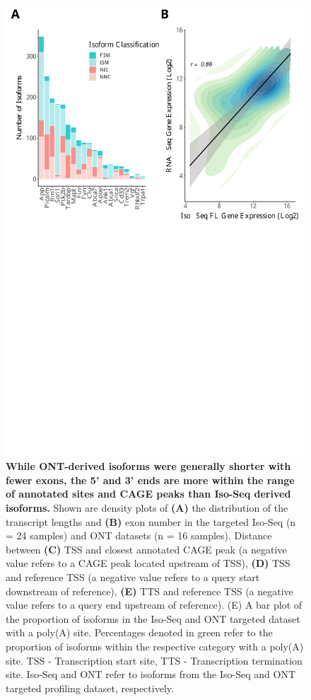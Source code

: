 \begin{figure}[!htp]
	\begin{center}
		\includegraphics[page=3,trim={0 9cm 0 0cm},clip,scale = 0.60]{Figures/ONTvsIsoSeq.pdf}
	\end{center}
	\captionsetup{width=0.95\textwidth}
	\caption[Comparison of Iso-Seq and ONT targeted datasets]%
	{\textbf{While ONT-derived isoforms were generally shorter with fewer exons, the 5' and 3' ends are more within the range of annotated sites and CAGE peaks than Iso-Seq derived isoforms.} Shown are density plots of \textbf{(A)} the distribution of the transcript lengths and \textbf{(B)} exon number in the targeted Iso-Seq (n = 24 samples) and ONT datasets (n = 16 samples). Distance between \textbf{(C)} TSS and closest annotated CAGE peak (a negative value refers to a CAGE peak located upstream of TSS), \textbf{(D)} TSS and reference TSS (a negative value refers to a query start downstream of reference), \textbf{(E)} TTS and reference TSS (a negative value refers to a query end upstream of reference). {(E)} A bar plot of the proportion of isoforms in the Iso-Seq and ONT targeted dataset with a poly(A) site. Percentages denoted in green refer to the proportion of isoforms within the respective category with a poly(A) site. TSS - Transcription start site, TTS - Transcription termination site. Iso-Seq and ONT refer to isoforms from the Iso-Seq and ONT targeted profiling dataset, respectively.}
	\label{fig:ont_isoseq_description}
\end{figure}


